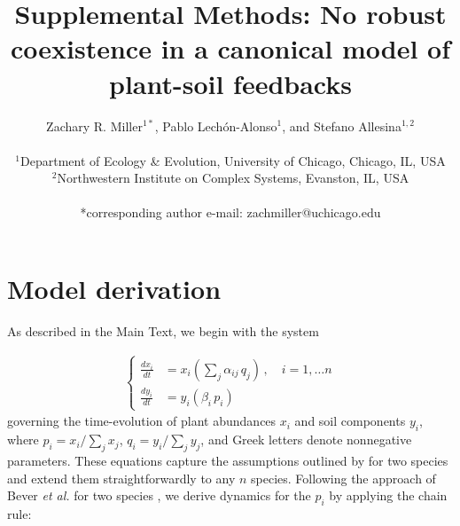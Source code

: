 \documentclass[11pt]{article}
\title{Supplemental Methods: No robust coexistence in a canonical model of plant-soil feedbacks}
\date{}
\author{Zachary R. Miller$^{1*}$, Pablo Lech\'{o}n-Alonso$^{1}$, and Stefano Allesina$^{1,2}$ \\
	\\
	\normalsize{$^{1}$Department of Ecology \& Evolution, University of Chicago, Chicago, IL, USA}\\
	\normalsize{$^{2}$Northwestern Institute on Complex Systems, Evanston, IL, USA}\\
	\\
	\normalsize{*corresponding author e-mail: zachmiller@uchicago.edu}\\
}
\begin{document}
\maketitle
{}
\linenumbers

\section{Model derivation}

As described in the Main Text, we begin with the system

\begin{align}
\begin{cases}
\frac{dx_i}{dt} &= x_i \left(\sum_{j} \alpha_{ij} \, q_j \right) \, , \quad  i = 1, \dots n \\
\frac{dy_i}{dt} &= y_i \left( \beta_i \, p_i \right)
\end{cases}
\end{align}
governing the time-evolution of plant abundances $x_i$ and soil components $y_i$, where $p_i = x_i / \sum_j x_j$, $q_i = y_i / \sum_j y_j$, and Greek letters denote nonnegative parameters. These equations capture the assumptions outlined by \citet{bever1997incorporating} for two species and extend them straightforwardly to any $n$ species. Following the approach of Bever \textit{et al.} for two species \citep[and consistent with other generalizations of this model,][]{kulmatiski2008plant,eppinga2018frequency}, we derive dynamics for the $p_i$ by applying the chain rule:
\end{document}
